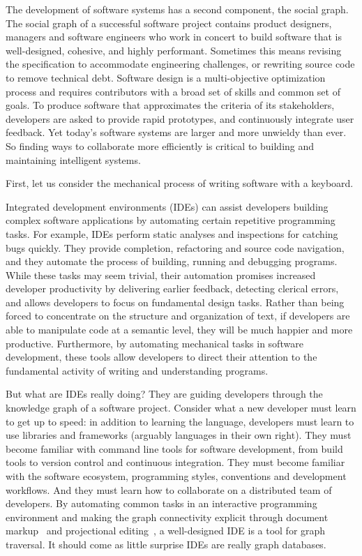 \documentclass[12pt,initial,twoside,maitrise]{dms}
\numberwithin{equation}{section}
\numberwithin{table}{chapter}
\numberwithin{figure}{chapter}
\begin{document}
The development of software systems has a second component, the social graph. The social graph of a successful software project contains product designers, managers and software engineers who work in concert to build software that is well-designed, cohesive, and highly performant. Sometimes this means revising the specification to accommodate engineering challenges, or rewriting source code to remove technical debt. Software design is a multi-objective optimization process and requires contributors with a broad set of skills and common set of goals. To produce software that approximates the criteria of its stakeholders, developers are asked to provide rapid prototypes, and continuously integrate user feedback. Yet today's software systems are larger and more unwieldy than ever. So finding ways to collaborate more efficiently is critical to building and maintaining intelligent systems.

First, let us consider the mechanical process of writing software with a keyboard.

Integrated development environments (IDEs) can assist developers building complex software applications by automating certain repetitive programming tasks. For example, IDEs perform static analyses and inspections for catching bugs quickly. They provide completion, refactoring and source code navigation, and they automate the process of building, running and debugging programs. While these tasks may seem trivial, their automation promises increased developer productivity by delivering earlier feedback, detecting clerical errors, and allows developers to focus on fundamental design tasks. Rather than being forced to concentrate on the structure and organization of text, if developers are able to manipulate code at a semantic level, they will be much happier and more productive. Furthermore, by automating mechanical tasks in software development, these tools allow developers to direct their attention to the fundamental activity of writing and understanding programs.

But what are IDEs really doing? They are guiding developers through the knowledge graph of a software project. Consider what a new developer must learn to get up to speed: in addition to learning the language, developers must learn to use libraries and frameworks (arguably languages in their own right). They must become familiar with command line tools for software development, from build tools to version control and continuous integration. They must become familiar with the software ecosystem, programming styles, conventions and development workflows. And they must learn how to collaborate on a distributed team of developers. By automating common tasks in an interactive programming environment and making the graph connectivity explicit through document markup~\citep{goldfarb1981generalized} and projectional editing~\citep{voelter2014towards}, a well-designed IDE is a tool for graph traversal. It should come as little surprise IDEs are really graph databases.
\end{document}
